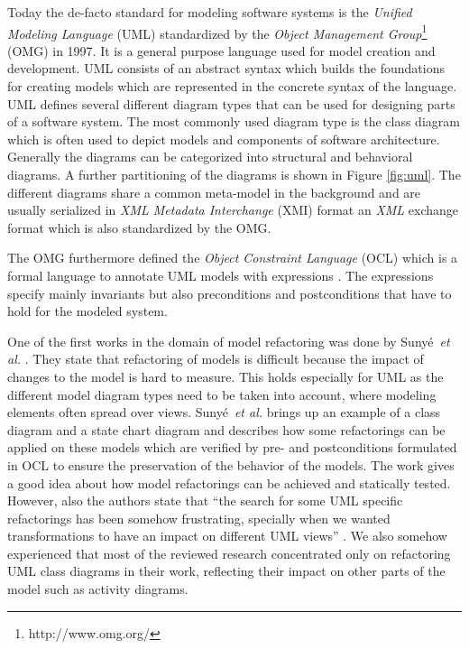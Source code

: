 \documentclass{llncs}
\begin{document}
Today the de-facto standard for modeling software systems is the \textit{Unified Modeling Language} (UML) \cite{man:UML} standardized by the
\textit{Object Management Group}\footnote{http://www.omg.org/} (OMG) in 1997. It is a general purpose language used
for model creation and development. UML consists of an abstract syntax which builds the foundations for creating 
models which are represented in the concrete syntax of the language. UML defines several different diagram types
that can be used for designing parts of a software system. The most commonly used diagram type is the class diagram
which is often used to depict models and components of software architecture. Generally the diagrams can be categorized
into structural and behavioral diagrams. A further partitioning of the diagrams is shown in Figure \ref{fig:uml}. The
different diagrams share a common meta-model in the background and are usually serialized in \textit{XML Metadata
Interchange} (XMI) format \cite{man:XMI} an \textit{XML} exchange format which is also
standardized by the OMG.

The OMG furthermore defined the \textit{Object Constraint Language} (OCL) \cite{man:OCL} which is a
formal language to annotate UML models with expressions \cite{man:OCL}. The expressions specify mainly
invariants but also preconditions and postconditions that have to hold for the modeled system.

One of the first works in the domain of model refactoring was done by Suny{\'e}~\textit{et al.} 
\cite{DBLP:conf/uml/SunyePTJ01}. They state that refactoring of models is difficult because the impact of changes to the
model is hard to measure. This holds especially for UML as the different model diagram types need to be taken into
account, where modeling elements often spread over views. Suny{\'e}~\textit{et al.} brings up an example of a class diagram and a
state chart diagram and describes how some refactorings can be applied on these models which are verified by pre- and
postconditions formulated in OCL to ensure the preservation of the behavior of the models. The work gives a good idea about how model
refactorings can be achieved and statically tested. However, also the authors state that ``the search for some UML
specific refactorings has been somehow frustrating, specially when we wanted transformations to have an impact on
different UML views'' \cite{DBLP:conf/uml/SunyePTJ01}. We also somehow experienced that most of the reviewed research
concentrated only on refactoring UML class diagrams in their work, reflecting their impact on other parts of the model 
such as activity diagrams.
\end{document}
